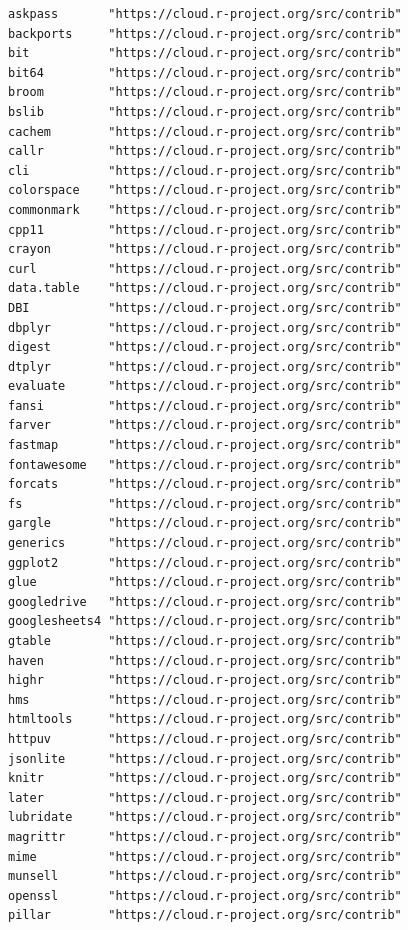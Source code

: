 \documentclass[
  letterpaper,
  DIV=11,
  numbers=noendperiod]{scrreprt}
\begin{document}
\begin{verbatim}
askpass       "https://cloud.r-project.org/src/contrib"
backports     "https://cloud.r-project.org/src/contrib"
bit           "https://cloud.r-project.org/src/contrib"
bit64         "https://cloud.r-project.org/src/contrib"
broom         "https://cloud.r-project.org/src/contrib"
bslib         "https://cloud.r-project.org/src/contrib"
cachem        "https://cloud.r-project.org/src/contrib"
callr         "https://cloud.r-project.org/src/contrib"
cli           "https://cloud.r-project.org/src/contrib"
colorspace    "https://cloud.r-project.org/src/contrib"
commonmark    "https://cloud.r-project.org/src/contrib"
cpp11         "https://cloud.r-project.org/src/contrib"
crayon        "https://cloud.r-project.org/src/contrib"
curl          "https://cloud.r-project.org/src/contrib"
data.table    "https://cloud.r-project.org/src/contrib"
DBI           "https://cloud.r-project.org/src/contrib"
dbplyr        "https://cloud.r-project.org/src/contrib"
digest        "https://cloud.r-project.org/src/contrib"
dtplyr        "https://cloud.r-project.org/src/contrib"
evaluate      "https://cloud.r-project.org/src/contrib"
fansi         "https://cloud.r-project.org/src/contrib"
farver        "https://cloud.r-project.org/src/contrib"
fastmap       "https://cloud.r-project.org/src/contrib"
fontawesome   "https://cloud.r-project.org/src/contrib"
forcats       "https://cloud.r-project.org/src/contrib"
fs            "https://cloud.r-project.org/src/contrib"
gargle        "https://cloud.r-project.org/src/contrib"
generics      "https://cloud.r-project.org/src/contrib"
ggplot2       "https://cloud.r-project.org/src/contrib"
glue          "https://cloud.r-project.org/src/contrib"
googledrive   "https://cloud.r-project.org/src/contrib"
googlesheets4 "https://cloud.r-project.org/src/contrib"
gtable        "https://cloud.r-project.org/src/contrib"
haven         "https://cloud.r-project.org/src/contrib"
highr         "https://cloud.r-project.org/src/contrib"
hms           "https://cloud.r-project.org/src/contrib"
htmltools     "https://cloud.r-project.org/src/contrib"
httpuv        "https://cloud.r-project.org/src/contrib"
jsonlite      "https://cloud.r-project.org/src/contrib"
knitr         "https://cloud.r-project.org/src/contrib"
later         "https://cloud.r-project.org/src/contrib"
lubridate     "https://cloud.r-project.org/src/contrib"
magrittr      "https://cloud.r-project.org/src/contrib"
mime          "https://cloud.r-project.org/src/contrib"
munsell       "https://cloud.r-project.org/src/contrib"
openssl       "https://cloud.r-project.org/src/contrib"
pillar        "https://cloud.r-project.org/src/contrib"

\end{verbatim}
\end{document}
